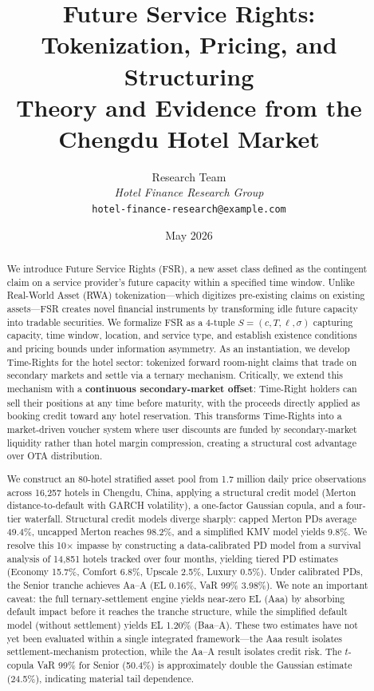 \documentclass[12pt,a4paper]{article}
\title{\textbf{Future Service Rights: Tokenization, Pricing, and Structuring}\\%
\large Theory and Evidence from the Chengdu Hotel Market}
\author{Research Team\\
\textit{Hotel Finance Research Group}\\
\small \texttt{hotel-finance-research@example.com}}
\date{May 2026}
\begin{document}
\maketitle

\begin{abstract}
We introduce Future Service Rights (FSR), a new asset class defined as the contingent claim on a service provider's future capacity within a specified time window.
Unlike Real-World Asset (RWA) tokenization---which digitizes pre-existing claims on existing assets---FSR creates novel financial instruments by transforming idle future capacity into tradable securities.
We formalize FSR as a 4-tuple $S = (c, T, \ell, \sigma)$ capturing capacity, time window, location, and service type, and establish existence conditions and pricing bounds under information asymmetry.
As an instantiation, we develop Time-Rights for the hotel sector: tokenized forward room-night claims that trade on secondary markets and settle via a ternary mechanism. Critically, we extend this mechanism with a \textbf{continuous secondary-market offset}: Time-Right holders can sell their positions at any time before maturity, with the proceeds directly applied as booking credit toward any hotel reservation. This transforms Time-Rights into a market-driven voucher system where user discounts are funded by secondary-market liquidity rather than hotel margin compression, creating a structural cost advantage over OTA distribution.

We construct an 80-hotel stratified asset pool from 1.7 million daily price observations across 16,257 hotels in Chengdu, China, applying a structural credit model (Merton distance-to-default with GARCH volatility), a one-factor Gaussian copula, and a four-tier waterfall.
Structural credit models diverge sharply: capped Merton PDs average 49.4\%, uncapped Merton reaches 98.2\%, and a simplified KMV model yields 9.8\%.
We resolve this 10$\times$ impasse by constructing a data-calibrated PD model from a survival analysis of 14,851 hotels tracked over four months, yielding tiered PD estimates (Economy 15.7\%, Comfort 6.8\%, Upscale 2.5\%, Luxury 0.5\%).
Under calibrated PDs, the Senior tranche achieves Aa--A (EL 0.16\%, VaR 99\% 3.98\%). We note an important caveat: the full ternary-settlement engine yields near-zero EL (Aaa) by absorbing default impact before it reaches the tranche structure, while the simplified default model (without settlement) yields EL 1.20\% (Baa--A). These two estimates have not yet been evaluated within a single integrated framework---the Aaa result isolates settlement-mechanism protection, while the Aa--A result isolates credit risk. The $t$-copula VaR 99\% for Senior (50.4\%) is approximately double the Gaussian estimate (24.5\%), indicating material tail dependence.


\end{abstract}
\end{document}
